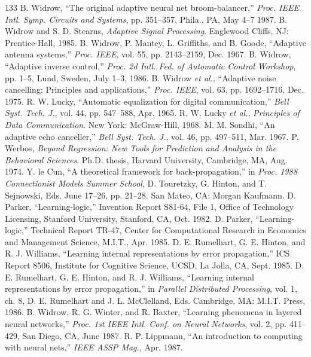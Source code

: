 \documentclass[10pt,twocolumn]{article}
\begin{document}
\begin{thebibliography}{133}
 B. Widrow, ``The original adaptive neural net broom-balancer,'' \textit{Proc. IEEE Intl. Symp. Circuits and Systems}, pp. 351--357, Phila., PA, May 4--7 1987.
 B. Widrow and S. D. Stearns, \textit{Adaptive Signal Processing}. Englewood Cliffs, NJ: Prentice-Hall, 1985.
 B. Widrow, P. Mantey, L. Griffiths, and B. Goode, ``Adaptive antenna systems,'' \textit{Proc. IEEE}, vol. 55, pp. 2143--2159, Dec. 1967.
 B. Widrow, ``Adaptive inverse control,'' \textit{Proc. 2d Intl. Fed. of Automatic Control Workshop}, pp. 1--5, Lund, Sweden, July 1--3, 1986.
 B. Widrow \textit{et al.}, ``Adaptive noise cancelling: Principles and applications,'' \textit{Proc. IEEE}, vol. 63, pp. 1692--1716, Dec. 1975.
 R. W. Lucky, ``Automatic equalization for digital communication,'' \textit{Bell Syst. Tech. J.}, vol. 44, pp. 547--588, Apr. 1965.
 R. W. Lucky \textit{et al.}, \textit{Principles of Data Communication}. New York: McGraw-Hill, 1968.
 M. M. Sondhi, ``An adaptive echo canceller,'' \textit{Bell Syst. Tech. J.}, vol. 46, pp. 497--511, Mar. 1967.
 P. Werbos, \textit{Beyond Regression: New Tools for Prediction and Analysis in the Behavioral Sciences}. Ph.D. thesis, Harvard University, Cambridge, MA, Aug. 1974.
 Y. le Cun, ``A theoretical framework for back-propagation,'' in \textit{Proc. 1988 Connectionist Models Summer School}, D. Touretzky, G. Hinton, and T. Sejnowski, Eds. June 17--26, pp. 21--28. San Mateo, CA: Morgan Kaufmann.
 D. Parker, ``Learning-logic,'' Invention Report S81-64, File 1, Office of Technology Licensing, Stanford University, Stanford, CA, Oct. 1982.
 D. Parker, ``Learning-logic,'' Technical Report TR-47, Center for Computational Research in Economics and Management Science, M.I.T., Apr. 1985.
 D. E. Rumelhart, G. E. Hinton, and R. J. Williams, ``Learning internal representations by error propagation,'' ICS Report 8506, Institute for Cognitive Science, UCSD, La Jolla, CA, Sept. 1985.
 D. E. Rumelhart, G. E. Hinton, and R. J. Williams, ``Learning internal representations by error propagation,'' in \textit{Parallel Distributed Processing}, vol. 1, ch. 8, D. E. Rumelhart and J. L. McClelland, Eds. Cambridge, MA: M.I.T. Press, 1986.
 B. Widrow, R. G. Winter, and R. Baxter, ``Learning phenomena in layered neural networks,'' \textit{Proc. 1st IEEE Intl. Conf. on Neural Networks}, vol. 2, pp. 411--429, San Diego, CA, June 1987.
 R. P. Lippmann, ``An introduction to computing with neural nets,'' \textit{IEEE ASSP Mag.}, Apr. 1987.

\end{thebibliography}
\end{document}
